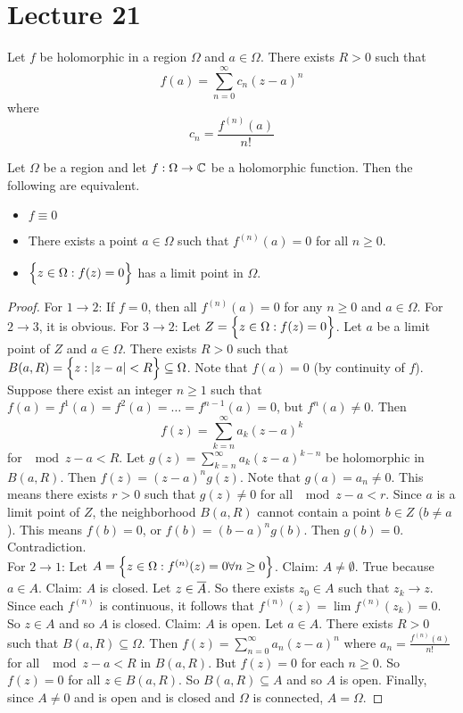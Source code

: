 \documentclass[12pt]{article}
\begin{document}
\section{Lecture 21} 
Let $f$ be holomorphic in a region $\Omega$ and $a \in \Omega$. There exists $R >0 $ such that $$f(a) = \sum_{n=0}^\infty c_n(z-a)^n $$ where $$c_n = \frac{f^{(n)}(a)}{n!} $$ 
\begin{theorem} Let $\Omega$ be a region and let $f: \Omega \to \mathbb{C}$ be a holomorphic function. Then the following are equivalent. \begin{itemize} \item $f \equiv 0$ \item There exists a point $a \in \Omega$ such that $f^{(n)}(a) = 0$ for all $n\geq 0$. \item $\Big\{ z \in \Omega: f(z) = 0 \Big\}$ has a limit point in $\Omega$. \end{itemize} \end{theorem} 
\begin{proof} For $1\to2$: If $f = 0$, then all $f^{(n)}(a) = 0$ for any $n \geq 0$ and $a \in \Omega$. For $2\to3$, it is obvious. For $3\to2$: Let $Z = \Big\{ z \in \Omega: f(z) = 0 \Big\}$. Let $a$ be a limit point of $Z$ and $a \in \Omega$. There exists $R > 0$ such that $B(a,R) = \Big\{ z : \abs{z-a} < R \Big\} \subseteq \Omega$. Note that $f(a) = 0$ (by continuity of $f$). Suppose there exist an integer $n \geq 1$ such that $f(a) = f^1(a) = f^2(a) = \dots = f^{n-1}(a) = 0$, but $f^n(a) \neq 0$. Then $$f(z) = \sum_{k=n}^\infty a_k(z-a)^k$$ for $\mod{z-a} < R$. Let $g(z) = \sum_{k=n}^\infty a_k(z-a)^{k-n}$ be holomorphic in $B(a,R)$. Then $f(z) = (z-a)^ng(z)$. Note that $g(a) = a_n \neq 0$. This means there exists $r > 0$ such that $g(z) \neq 0$ for all $\mod{z-a} < r$. Since $a$ is a limit point of $Z$, the neighborhood $B(a,R)$ cannot contain a point $b \in Z$ ($b\neq a$). This means $f(b) = 0$, or $f(b) = (b-a)^ng(b)$. Then $g(b) = 0$. Contradiction. \\
For $2\to1$: Let $A = \Big\{ z \in \Omega: f^{(n)}(z) = 0 \forall n \geq 0 \Big\}$. Claim: $A \neq \emptyset$. True because $a \in A$. Claim: $A$ is closed. Let $z \in \overline{A}$. So there exists $z_0 \in A$ such that $z_k \to z$. Since each $f^{(n)}$ is continuous, it follows that $f^{(n)}(z) = \lim f^{(n)}(z_k) = 0$. So $z \in A$ and so $A$ is closed. Claim: $A$ is open. Let $a\in A$. There exists $R > 0$ such that $B(a,R) \subseteq \Omega$. Then $f(z) = \sum_{n=0}^\infty a_n(z-a)^n$ where $a_n = \frac{f^{(n)}(a)}{n!}$ for all $\mod{z-a} < R$ in $B(a,R)$. But $f(z) = 0$ for each $n\geq 0$. So $f(z) = 0$ for all $z \in B(a,R)$. So $B(a,R) \subseteq A$ and so $A$ is open. Finally, since $A \neq 0$ and is open and is closed and $\Omega$ is connected, $A = \Omega$. \end{proof} 
\end{document}
